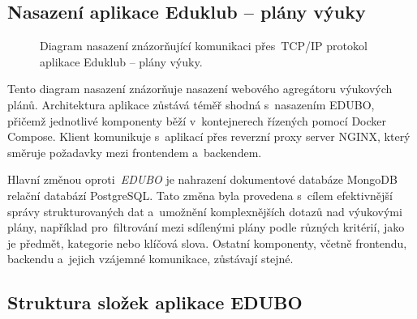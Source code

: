 \documentclass[male,czech,api_bc]{kitheses}
\begin{document}
\subsection{Nasazení aplikace Eduklub – plány výuky}

\begin{figure}[H]
	\centering
	\caption{Diagram nasazení znázorňující komunikaci přes~TCP/IP protokol aplikace Eduklub – plány výuky.}
	\label{fig:deployment-diagram-2}
\end{figure}


Tento diagram nasazení znázorňuje nasazení webového agregátoru výukových plánů. Architektura aplikace zůstává téměř shodná s~nasazením EDUBO, přičemž jednotlivé komponenty běží v~kontejnerech řízených pomocí Docker Compose. Klient komunikuje s~aplikací přes reverzní proxy server NGINX, který směruje požadavky mezi frontendem a~backendem.

Hlavní změnou oproti~\textit{EDUBO} je nahrazení dokumentové databáze MongoDB relační databází PostgreSQL. Tato změna byla provedena s~cílem efektivnější správy strukturovaných dat a~umožnění komplexnějších dotazů nad výukovými plány, například pro~filtrování mezi sdílenými plány podle různých kritérií, jako je předmět, kategorie nebo klíčová slova. Ostatní komponenty, včetně frontendu, backendu a~jejich vzájemné komunikace, zůstávají stejné.

\subsection{Struktura složek aplikace EDUBO}
\end{document}
